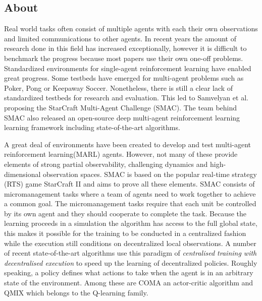 \label{chapter:starcraftmultiagentchallenge}
\subsection{About} 
Real world tasks often consist of multiple agents with each their own observations and limited communications to other agents. In recent years the amount of research
done in this field has increased exceptionally, however it is difficult to benchmark the progress because  most
papers use their own one-off problems. Standardized environments for single-agent reinforcement learning have enabled great progress. Some testbeds have emerged for multi-agent problems such as Poker\citep{heinrich2016deep}, Pong\citep{tampuu2017multiagent} or Keepaway Soccer\citep{stone2005keepaway}. Nonetheless, there is still a clear lack of standardized testbeds for research and evaluation. This led to Samvelyan et al.\citep{samvelyan2019starcraft} proposing the StarCraft Multi-Agent Challenge (SMAC). The team behind SMAC also released an open-source deep multi-agent reinforcement learning learning framework including state-of-the-art algorithms.

A great deal of environments have been created to develop and test multi-agent reinforcement learning(MARL) agents. However, not many of these provide elements of strong partial observability, challenging dynamics and high-dimensional observation spaces. SMAC is based on the popular real-time strategy (RTS) game StarCraft II and aims to prove all these elements. SMAC consists of micromanagement tasks where a team of agents need to work together to achieve a common goal. The micromanagement tasks require that each unit be controlled by its own agent and they should cooperate to complete the task. Because the learning proceeds in a simulation the algorithm has access to the full global state, this makes it possible for the training to be conducted in a centralized fashion while the execution still conditions on decentralized local observations. A number of recent state-of-the-art algorithms use this paradigm of \textit{centralised training with decentralised execution} to speed up the learning of decentralized policies. Roughly speaking, a policy defines what actions to take when the agent is in an arbitrary state of the environment. Among these are COMA\citep{foerster2018counterfactual} an actor-critic algorithm and QMIX\citep{rashid2018qmix} which belongs to the Q-learning family.

